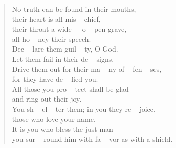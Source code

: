 \begin{flushleft}
\begin{verse}
 No truth can be found in their mouths,\\
their heart is all mis -- chief,\\
their throat a wide- -- o -- pen grave,\\
all ho -- ney their speech.\\
\vspace{5 mm}
 Dec -- lare them guil -- ty, O God.\\
Let them fail in their de -- signs.\\
Drive them out for their ma -- ny of -- fen -- ses,\\
for they have de -- fied you.\\
\vspace{5 mm}
 All those you pro -- tect shall be glad\\
and ring out their joy.\\
You sh -- el -- ter them; in you they re -- joice,\\
those who love your name.\\
\vspace{5 mm}
 It is you who bless the just man\\
you sur -- round him with fa -- vor as with a shield.\\
\vspace{5 mm}
\end{verse}
\end{flushleft}
